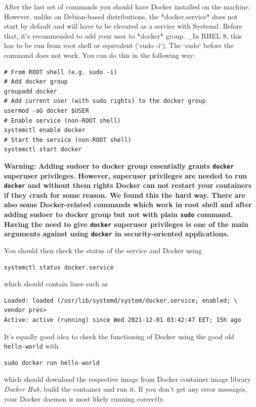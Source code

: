 \documentclass{article}
\begin{document}
\begin{markdown}
After the last set of commands you should have Docker installed on the machine. However, unlike on Debian-based distributions, the *docker.service* does not start by default and will have to be elevated as a service with Systemd. Before that, it's recommended to add your user to *docker* group. _In RHEL 8, this has to be run from root shell or equivalent (`sudo -i`), The `sudo` before the command does not work. You can do this in the following way:
\end{markdown}

\begin{verbatim}
# From ROOT shell (e.g. sudo -i)
# Add docker group
groupadd docker
# Add current user (with sudo rights) to the docker group
usermod -aG docker $USER
# Enable service (non-ROOT shell)
systemctl enable docker
# Start the service (non-ROOT shell)
systemctl start docker
\end{verbatim}

\textbf{Warning: Adding sudoer to docker group essentially grants \texttt{docker} superuser privileges. However, superuser privileges are needed to run \texttt{docker} and without them rights Docker can not restart your containers if they crash for some reason. We found this the hard way. There are also some Docker-related commands which work in root shell and after adding sudoer to docker group but not with plain \texttt{sudo} command. Having the need to give \texttt{docker} superuser privileges is one of the main arguments against using \texttt{docker} in security-oriented applications.}

\begin{markdown}
You should then check the status of the service and Docker using
\end{markdown}
\begin{verbatim}
systemctl status docker.service
\end{verbatim}

which should contain lines such as
\begin{verbatim}
Loaded: loaded (/usr/lib/systemd/system/docker.service; enabled; \ 
vendor pres>
Active: active (running) since Wed 2021-12-01 03:42:47 EET; 15h ago
\end{verbatim}

It's equally good idea to check the functioning of Docker using the good old \texttt{hello-world} with
\begin{verbatim}
sudo docker run hello-world
\end{verbatim}
which should download the respective image from Docker container image library \emph{Docker Hub}, build the container and run it. If you don't get any error messages, your Docker daemon is most likely running correctly. 
\end{document}
